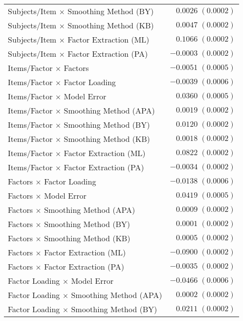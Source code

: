 \documentclass[
  english,
  man]{apa6}
\begin{document}
\begin{center}
\begin{longtable}{l r }
Subjects/Item $\times$ Smoothing Method (BY)           & $0.0026 \; (0.0002)$  \\
Subjects/Item $\times$ Smoothing Method (KB)           & $0.0047 \; (0.0002)$  \\
Subjects/Item $\times$ Factor Extraction (ML)          & $0.1066 \; (0.0002)$  \\
Subjects/Item $\times$ Factor Extraction (PA)          & $-0.0003 \; (0.0002)$ \\
Items/Factor $\times$ Factors                          & $-0.0051 \; (0.0005)$ \\
Items/Factor $\times$ Factor Loading                   & $-0.0039 \; (0.0006)$ \\
Items/Factor $\times$ Model Error                      & $0.0360 \; (0.0005)$  \\
Items/Factor $\times$ Smoothing Method (APA)           & $0.0019 \; (0.0002)$  \\
Items/Factor $\times$ Smoothing Method (BY)            & $0.0120 \; (0.0002)$  \\
Items/Factor $\times$ Smoothing Method (KB)            & $0.0018 \; (0.0002)$  \\
Items/Factor $\times$ Factor Extraction (ML)           & $0.0822 \; (0.0002)$  \\
Items/Factor $\times$ Factor Extraction (PA)           & $-0.0034 \; (0.0002)$ \\
Factors $\times$ Factor Loading                        & $-0.0138 \; (0.0006)$ \\
Factors $\times$ Model Error                           & $0.0419 \; (0.0005)$  \\
Factors $\times$ Smoothing Method (APA)                & $0.0009 \; (0.0002)$  \\
Factors $\times$ Smoothing Method (BY)                 & $0.0001 \; (0.0002)$  \\
Factors $\times$ Smoothing Method (KB)                 & $0.0005 \; (0.0002)$  \\
Factors $\times$ Factor Extraction (ML)                & $-0.0900 \; (0.0002)$ \\
Factors $\times$ Factor Extraction (PA)                & $-0.0035 \; (0.0002)$ \\
Factor Loading $\times$ Model Error                    & $-0.0466 \; (0.0006)$ \\
Factor Loading $\times$ Smoothing Method (APA)         & $0.0002 \; (0.0002)$  \\
Factor Loading $\times$ Smoothing Method (BY)          & $0.0211 \; (0.0002)$  \\

\end{longtable}
\end{center}
\end{document}
